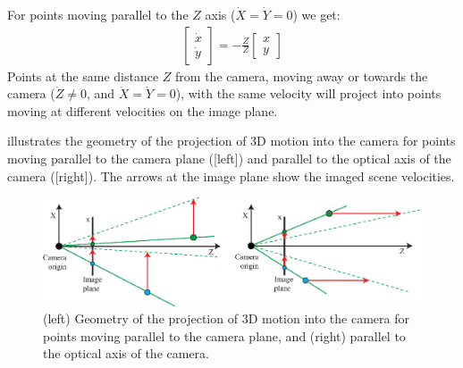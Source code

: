 
For points moving parallel to the $Z$ axis ($\dot{X} = \dot{Y} = 0$) we get:
\begin{align}
    \begin{bmatrix}
        \dot{x} \\
        \dot{y}
    \end{bmatrix}
    = -\frac{\dot{Z}}{Z}
    \begin{bmatrix}
        x \\
        y
    \end{bmatrix}
    \label{eq:forward_objects}
\end{align}
Points at the same distance $Z$ from the camera, moving away or towards the camera ($\dot{Z} \neq 0$, and $\dot{X} = \dot{Y} = 0$), with the same velocity will project into points moving at different velocities on the image plane.


\Fig{\ref{fig:examples_3d_moving_points}} illustrates the geometry of the projection of 3D motion into the camera for points moving parallel to the camera plane (\fig{\ref{fig:examples_3d_moving_points}}[left]) and parallel to the optical axis of the camera (\fig{\ref{fig:examples_3d_moving_points}}[right]). The arrows at the image plane show the imaged scene velocities.
\begin{figure}
    \centerline{
        \includegraphics[width=1\linewidth]{figures/optical_flow/examples_3d_moving_points.eps}
    }
    \caption{(left) Geometry of the projection of 3D motion into the camera for points moving parallel to the camera plane, and (right) parallel to the optical axis of the camera.}
    \label{fig:examples_3d_moving_points}
\end{figure}

